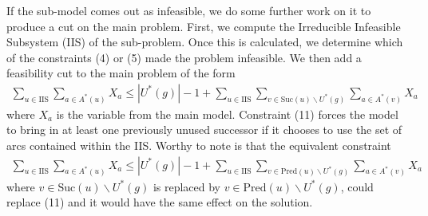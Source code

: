 \documentclass{article}
\newcommand{\Pred}{\text{Pred}}
\newcommand{\Suc}{\text{Suc}}
\begin{document}
If the sub-model comes out as infeasible, we do some further work on it to produce a cut on the main problem. First, we compute the Irreducible Infeasible Subsystem (IIS) of the sub-problem. Once this is calculated, we determine which of the constraints (4) or (5) made the problem infeasible. We then add a feasibility cut to the main problem of the form \begin{align}\sum_{u\in \text{IIS}}\sum_{a\in A^*(u)}X_a\leq|U^*(g)|-1+\sum_{u\in \text{IIS}}\sum_{v\in\Suc(u)\backslash U^*(g)}\sum_{a\in A^*(v)}X_a\end{align} where $X_a$ is the variable from the main model. Constraint (11) forces the model to bring in at least one previously unused successor if it chooses to use the set of arcs contained within the IIS. Worthy to note is that the equivalent constraint \begin{align}\sum_{u\in \text{IIS}}\sum_{a\in A^*(u)}X_a\leq|U^*(g)|-1+\sum_{u\in \text{IIS}}\sum_{v\in\Pred(u)\backslash U^*(g)}\sum_{a\in A^*(v)}X_a\end{align} where $v\in\Suc(u)\backslash U^*(g)$ is replaced by $v\in\Pred(u)\backslash U^*(g)$, could replace (11) and it would have the same effect on the solution.
\end{document}
